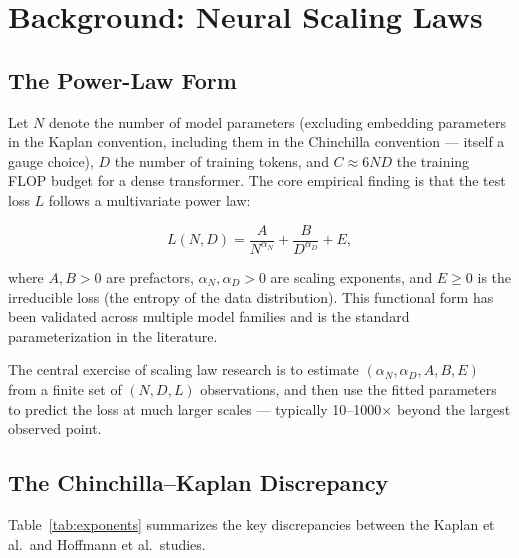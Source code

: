 \documentclass[12pt,a4paper]{article}
\theoremstyle{remark}
\newcommand{\Loss}{L}
\begin{document}
\section{Background: Neural Scaling Laws}
\label{sec:background}

\subsection{The Power-Law Form}

Let $N$ denote the number of model parameters (excluding embedding parameters in the Kaplan convention, including them in the Chinchilla convention — itself a gauge choice), $D$ the number of training tokens, and $C \approx 6ND$ the training FLOP budget for a dense transformer. The core empirical finding is that the test loss $\Loss$ follows a multivariate power law:

\begin{equation}
\Loss(N, D) = \frac{A}{N^{\alpha_N}} + \frac{B}{D^{\alpha_D}} + E,
\label{eq:scaling_form}
\end{equation}

where $A, B > 0$ are prefactors, $\alpha_N, \alpha_D > 0$ are scaling exponents, and $E \geq 0$ is the irreducible loss (the entropy of the data distribution). This functional form has been validated across multiple model families \cite{kaplan2020scaling, hoffmann2022training, henighan2020scaling} and is the standard parameterization in the literature.

The central exercise of scaling law research is to estimate $(\alpha_N, \alpha_D, A, B, E)$ from a finite set of $(N, D, \Loss)$ observations, and then use the fitted parameters to predict the loss at much larger scales — typically 10--1000$\times$ beyond the largest observed point.

\subsection{The Chinchilla--Kaplan Discrepancy}

Table~\ref{tab:exponents} summarizes the key discrepancies between the Kaplan et al.\ and Hoffmann et al.\ studies.
\end{document}
